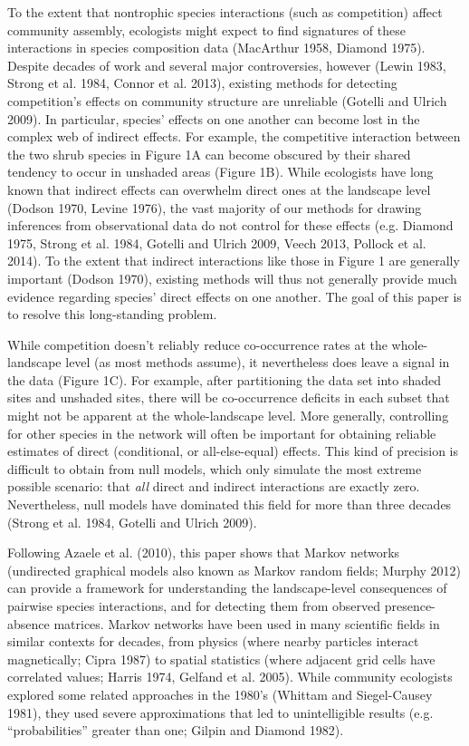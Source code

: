 \documentclass[12pt,]{article}
\begin{document}
\begin{spacing}{1.9}
\begin{flushleft}
To the extent that nontrophic species interactions (such as competition)
affect community assembly, ecologists might expect to find signatures of
these interactions in species composition data (MacArthur 1958, Diamond
1975). Despite decades of work and several major controversies, however
(Lewin 1983, Strong et al. 1984, Connor et al. 2013), existing methods
for detecting competition's effects on community structure are
unreliable (Gotelli and Ulrich 2009). In particular, species' effects on
one another can become lost in the complex web of indirect effects. For
example, the competitive interaction between the two shrub species in
Figure 1A can become obscured by their shared tendency to occur in
unshaded areas (Figure 1B). While ecologists have long known that
indirect effects can overwhelm direct ones at the landscape level
(Dodson 1970, Levine 1976), the vast majority of our methods for drawing
inferences from observational data do not control for these effects
(e.g. Diamond 1975, Strong et al. 1984, Gotelli and Ulrich 2009, Veech
2013, Pollock et al. 2014). To the extent that indirect interactions
like those in Figure 1 are generally important (Dodson 1970), existing
methods will thus not generally provide much evidence regarding species'
direct effects on one another. The goal of this paper is to resolve this
long-standing problem.

While competition doesn't reliably reduce co-occurrence rates at the
whole-landscape level (as most methods assume), it nevertheless does
leave a signal in the data (Figure 1C). For example, after partitioning
the data set into shaded sites and unshaded sites, there will be
co-occurrence deficits in each subset that might not be apparent at the
whole-landscape level. More generally, controlling for other species in
the network will often be important for obtaining reliable estimates of
direct (conditional, or all-else-equal) effects. This kind of precision
is difficult to obtain from null models, which only simulate the most
extreme possible scenario: that \emph{all} direct and indirect
interactions are exactly zero. Nevertheless, null models have dominated
this field for more than three decades (Strong et al. 1984, Gotelli and
Ulrich 2009).

Following Azaele et al. (2010), this paper shows that Markov networks
(undirected graphical models also known as Markov random fields; Murphy
2012) can provide a framework for understanding the landscape-level
consequences of pairwise species interactions, and for detecting them
from observed presence-absence matrices. Markov networks have been used
in many scientific fields in similar contexts for decades, from physics
(where nearby particles interact magnetically; Cipra 1987) to spatial
statistics (where adjacent grid cells have correlated values; Harris
1974, Gelfand et al. 2005). While community ecologists explored some
related approaches in the 1980's (Whittam and Siegel-Causey 1981), they
used severe approximations that led to unintelligible results (e.g.
``probabilities'' greater than one; Gilpin and Diamond 1982).


\end{flushleft}
\end{spacing}
\end{document}
